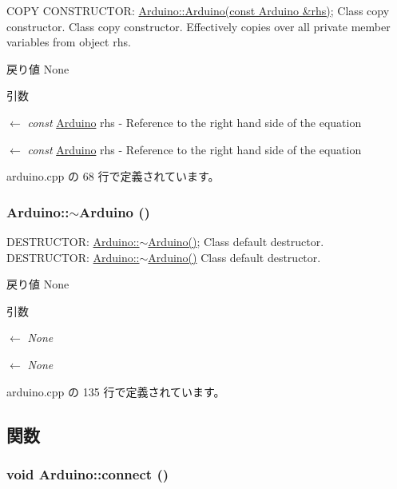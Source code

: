 COPY CONSTRUCTOR: \hyperlink{classArduino_abb555c50c1812b3b81211ffc490ff70f_abb555c50c1812b3b81211ffc490ff70f}{Arduino::Arduino(const Arduino \&rhs)}; Class copy constructor. Class copy constructor. Effectively copies over all private member variables from object rhs.

\begin{DoxyReturn}{戻り値}
None 
\end{DoxyReturn}

\begin{DoxyParams}{引数}
\item[\mbox{$\leftarrow$} {\em const}]\hyperlink{classArduino}{Arduino} rhs -\/ Reference to the right hand side of the equation\item[\mbox{$\leftarrow$} {\em const}]\hyperlink{classArduino}{Arduino} rhs -\/ Reference to the right hand side of the equation \end{DoxyParams}


 arduino.cpp の 68 行で定義されています。\hypertarget{classArduino_a9e70a2c4fd95f0a432845209ec3b6c11_a9e70a2c4fd95f0a432845209ec3b6c11}{
\subsubsection[{$\sim$Arduino}]{\setlength{\rightskip}{0pt plus 5cm}Arduino::$\sim$Arduino ()}}
\label{classArduino_a9e70a2c4fd95f0a432845209ec3b6c11_a9e70a2c4fd95f0a432845209ec3b6c11}


DESTRUCTOR: \hyperlink{classArduino_a9e70a2c4fd95f0a432845209ec3b6c11_a9e70a2c4fd95f0a432845209ec3b6c11}{Arduino::$\sim$Arduino()}; Class default destructor. DESTRUCTOR: \hyperlink{classArduino_a9e70a2c4fd95f0a432845209ec3b6c11_a9e70a2c4fd95f0a432845209ec3b6c11}{Arduino::$\sim$Arduino()} Class default destructor.

\begin{DoxyReturn}{戻り値}
None 
\end{DoxyReturn}

\begin{DoxyParams}{引数}
\item[\mbox{$\leftarrow$} {\em None}]\item[\mbox{$\leftarrow$} {\em None}]\end{DoxyParams}


 arduino.cpp の 135 行で定義されています。

\subsection{関数}
\hypertarget{classArduino_a56445661e05ebbe6fa7b30cb15f59e47_a56445661e05ebbe6fa7b30cb15f59e47}{
\subsubsection[{connect}]{\setlength{\rightskip}{0pt plus 5cm}void Arduino::connect ()}}
\label{classArduino_a56445661e05ebbe6fa7b30cb15f59e47_a56445661e05ebbe6fa7b30cb15f59e47}


